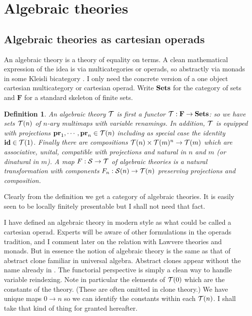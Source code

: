 \documentclass[12pt, amstex, amssymb]{article}
\newtheorem{definition}[theorem]{Definition}
\newcommand{\mcat}{\cal}
\newcommand{\cat}{\mathbf}
\begin{document}
\section{Algebraic theories}

\subsection{Algebraic theories as cartesian operads}
An algebraic theory is a theory of equality on
terms. A clean mathematical expression of the idea is 
via multicategories or operads, so
abstractly via monads in some Kleisli bicategory \cite{FGHW}. I
only need
the concrete version of a one object cartesian multicategory or 
cartesian operad. Write ${\bf Sets}$ for the category of sets
and ${\cat F}$ for a standard skeleton 
of finite sets.
\begin{definition}
An {\em algebraic theory} $\mcat T$ is first
a functor ${\mcat T}: {\cat F} \to {\bf Sets}$:
so we have sets ${\cal T}(n)$ 
of $n$-ary multimaps with variable renamings. In addition, $\mcat T$
is equipped with projections ${\bf pr}_1, \cdots ,{\bf pr}_n \in {\mcat T}(n)$
including as special case the identity ${\bf id} \in {\cal T}(1)$. Finally
there are compositions ${\cal T}(n) \times {\cal T}(m)^n  \to 
{\cal T}(m)$ which are associative, unital, compatible with projections
and natural in $n$ and $m$ (or dinatural in $m$).
A {\em map $F : {\mcat S} \to {\mcat T}$ of algebraic theories}
is a natural transformation with components
$F_n : {\mcat S}(n) \to {\mcat T}(n)$
preserving projections and composition.
\end{definition}
Clearly from the definition we get a category of algebraic theories.
It is easily seen to be locally finitely presentable but I shall not
need that fact.

I have defined an algebraic theory in modern style as
what could be called a cartesian operad. Experts will be 
aware of other formulations in the operads tradition, and 
I comment later on the relation with Lawvere theories and monads.
But in essence the notion of algebraic theory
is the same as that of abstract clone \cite{Tay93} familiar in universal
algebra. Abstract clones appear without the name 
already in \cite{Tay73}. The functorial perspective
is simply a clean way to handle variable reindexing.
Note in particular the elements of ${\mcat T}(0)$ which are the constants
of the theory. (These are often omitted in clone theory.)
We have unique maps $0 \to n$ so we can identify the constants within
each ${\mcat T}(n)$. I shall take that kind of thing for
granted hereafter.
\end{document}
